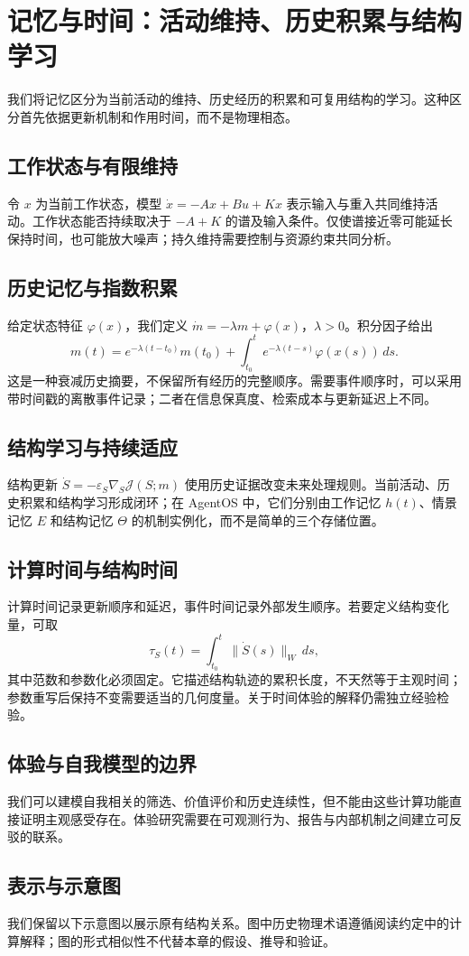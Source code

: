 \chapter{记忆与时间：活动维持、历史积累与结构学习}
\label{chp:phenomenological_physics}
\label{sec:section_9311}
\label{sec:recall_dynamics}
\label{sec:section_8767}
\label{sec:psychological_illusion_of_time}
\label{sec:geometry_of_qualia}
\label{sec:section_6647}
\label{sec:ontogenesis_of_observer}
\label{sec:consciousness_closed_loop}
\label{sec:consciousness_macro_structure_summary}
\label{subsec:cosmic_recursion_hypothesis}
\label{sec:section_1098}
\label{sec:geometric_illusion_of_time_flow}

我们将记忆区分为当前活动的维持、历史经历的积累和可复用结构的学习。这种区分首先依据更新机制和作用时间，而不是物理相态。
\section{工作状态与有限维持}
令 $x$ 为当前工作状态，模型 $\dot x=-Ax+Bu+Kx$ 表示输入与重入共同维持活动。工作状态能否持续取决于 $-A+K$ 的谱及输入条件。仅使谱接近零可能延长保持时间，也可能放大噪声；持久维持需要控制与资源约束共同分析。
\section{历史记忆与指数积累}
给定状态特征 $\varphi(x)$，我们定义 $\dot m=-\lambda m+\varphi(x)$，$\lambda>0$。积分因子给出
\begin{equation}m(t)=e^{-\lambda(t-t_0)}m(t_0)+\int_{t_0}^t e^{-\lambda(t-s)}\varphi(x(s))\,ds.\end{equation}
这是一种衰减历史摘要，不保留所有经历的完整顺序。需要事件顺序时，可以采用带时间戳的离散事件记录；二者在信息保真度、检索成本与更新延迟上不同。
\section{结构学习与持续适应}
结构更新 $\dot S=-\varepsilon_S\nabla_S\mathcal J(S;m)$ 使用历史证据改变未来处理规则。当前活动、历史积累和结构学习形成闭环；在 AgentOS 中，它们分别由工作记忆 $h(t)$、情景记忆 $E$ 和结构记忆 $\Theta$ 的机制实例化，而不是简单的三个存储位置。
\section{计算时间与结构时间}
计算时间记录更新顺序和延迟，事件时间记录外部发生顺序。若要定义结构变化量，可取
\begin{equation}\tau_S(t)=\int_{t_0}^t\|\dot S(s)\|_W\,ds,\end{equation}
其中范数和参数化必须固定。它描述结构轨迹的累积长度，不天然等于主观时间；参数重写后保持不变需要适当的几何度量。关于时间体验的解释仍需独立经验检验。
\section{体验与自我模型的边界}
我们可以建模自我相关的筛选、价值评价和历史连续性，但不能由这些计算功能直接证明主观感受存在。体验研究需要在可观测行为、报告与内部机制之间建立可反驳的联系。

\section{表示与示意图}
我们保留以下示意图以展示原有结构关系。图中历史物理术语遵循阅读约定中的计算解释；图的形式相似性不代替本章的假设、推导和验证。

